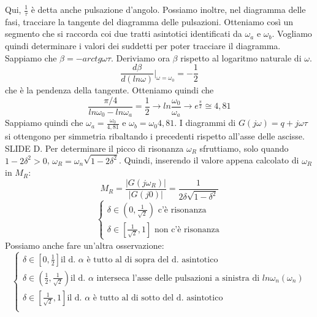 \documentclass[11pt]{article}
\begin{document}
Qui, $\frac{1}{\tau}$ è detta anche pulsazione d'angolo. Possiamo inoltre, nel diagramma delle fasi, tracciare la tangente del diagramma delle pulsazioni. Otteniamo così un segmento che si raccorda coi due tratti asintotici identificati da $\omega_a$ e $\omega_b$. Vogliamo quindi determinare i valori dei suddetti per poter tracciare il diagramma.
Sappiamo che $\beta = -arctg \omega \tau$. Deriviamo ora $\beta$ rispetto al logaritmo naturale di $\omega$.
\begin{displaymath}
    \frac{d\beta}{d(ln\omega)}|_{\omega=\omega_0} = -\frac{1}{2}
\end{displaymath}
che è la pendenza della tangente. Otteniamo quindi che
\begin{displaymath}
    \frac{\pi/4}{ln\omega_0-ln\omega_a}=\frac{1}{2} \rightarrow ln\frac{\omega_0}{\omega_a} \rightarrow e^{\frac{\pi}{2}} \cong 4,81
\end{displaymath}
Sappiamo quindi che $\omega_a = \frac{\omega_0}{4,81}$ e $\omega_b = \omega_0 4,81$. I diagrammi di $G(j\omega) = q+j\omega\tau$ si ottengono per simmetria ribaltando i precedenti rispetto all'asse delle ascisse.
SLIDE D.
Per determinare il picco di risonanza $\omega_R$ sfruttiamo, solo quando $1-2\delta^2 >0$, $\omega_R = \omega_n\sqrt{1-2\delta^2}$. Quindi, inserendo il valore appena calcolato di $\omega_R$ in $M_R$:
\begin{displaymath}
    M_R = \frac{|G(j\omega_R)|}{|G(j0)|} = \frac{1}{2\delta\sqrt{1-\delta^2}}
\end{displaymath}
\begin{displaymath}
    \begin{cases}
        \delta \in \left(0,\frac{1}{\sqrt{2}}\right) \textrm{ c'è risonanza} \\
        \delta \in \left[\frac{1}{\sqrt{2}},1\right] \textrm{ non c'è risonanza}
    \end{cases}
\end{displaymath}
Possiamo anche fare un'altra osservazione:
\begin{displaymath}
    \begin{cases}
        \delta \in \left[0,\frac{1}{2}\right] \textrm{il d. }\alpha\textrm{ è tutto al di sopra del d. asintotico}                                                 \\
        \delta \in \left(\frac{1}{2},\frac{1}{\sqrt{2}}\right) \textrm{il d. }\alpha\textrm{ interseca l'asse delle pulsazioni a sinistra di }ln\omega_n(\omega_n) \\
        \delta \in \left[\frac{1}{\sqrt{2}},1\right] \textrm{il d. }\alpha\textrm{ è tutto al di sotto del d. asintotico}                                          \\
    \end{cases}
\end{displaymath}
\end{document}
